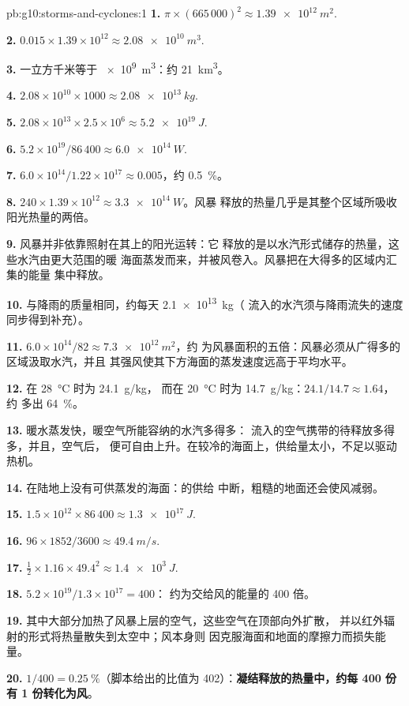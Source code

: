 \begin{solution}{pb:g10:storms-and-cyclones:1}
\textbf{1.} $\pi \times (665\,000)^2 \approx \qty{1.39e12}{m^2}$.

\textbf{2.} $0.015 \times 1.39\times10^{12} \approx \qty{2.08e10}{m^3}$.

\textbf{3.} 一立方千米等于 \qty{e9}{m^3}：约 \qty{21}{km^3}。

\textbf{4.} $2.08\times10^{10} \times 1000 \approx \qty{2.08e13}{kg}$.

\textbf{5.} $2.08\times10^{13} \times 2.5\times10^6 \approx \qty{5.2e19}{J}$.

\textbf{6.} $5.2\times10^{19}/86\,400 \approx \qty{6.0e14}{W}$.

\textbf{7.} $6.0\times10^{14}/1.22\times10^{17} \approx 0.005$，约
\qty{0.5}{\percent}。

\textbf{8.} $240 \times 1.39\times10^{12} \approx \qty{3.3e14}{W}$。风暴
释放的热量几乎是其整个区域所吸收阳光热量的两倍。

\textbf{9.} 风暴并非依靠照射在其上的阳光运转：它
释放的是以水汽形式储存的热量，这些水汽由更大范围的暖
海面蒸发而来，并被风卷入。风暴把在大得多的区域内汇集的能量
集中释放。

\textbf{10.} 与降雨的质量相同，约每天 \qty{2.1e13}{kg}（
流入的水汽须与降雨流失的速度同步得到补充）。

\textbf{11.} $6.0\times10^{14}/82 \approx \qty{7.3e12}{m^2}$，约
为风暴面积的五倍：风暴必须从广得多的区域汲取水汽，并且
其强风使其下方海面的蒸发速度远高于平均水平。

\textbf{12.} 在 \qty{28}{\degreeCelsius} 时为 \qty{24.1}{g/kg}，
而在 \qty{20}{\degreeCelsius} 时为 \qty{14.7}{g/kg}：$24.1/14.7 \approx 1.64$，约
多出 \qty{64}{\percent}。

\textbf{13.} 暖水蒸发快，暖空气所能容纳的水汽多得多：
流入的空气携带的待释放多得多，并且，空气后，
便可自由上升。在较冷的海面上，供给量太小，不足以驱动
热机。

\textbf{14.} 在陆地上没有可供蒸发的海面：的供给
中断，粗糙的地面还会使风减弱。

\textbf{15.} $1.5\times10^{12} \times 86\,400 \approx \qty{1.3e17}{J}$.

\textbf{16.} $96 \times 1852/3600 \approx \qty{49.4}{m/s}$.

\textbf{17.} $\frac12 \times 1.16 \times 49.4^2 \approx \qty{1.4e3}{J}$.

\textbf{18.} $5.2\times10^{19}/1.3\times10^{17} = 400$：
约为交给风的能量的 400 倍。

\textbf{19.} 其中大部分加热了风暴上层的空气，这些空气在顶部向外扩散，
并以红外辐射的形式将热量散失到太空中；风本身则
因克服海面和地面的摩擦力而损失能量。

\textbf{20.} $1/400 = \qty{0.25}{\percent}$（脚本给出的比值为
402）：\textbf{凝结释放的热量中，约每 400 份
有 1 份转化为风}。
\end{solution}
